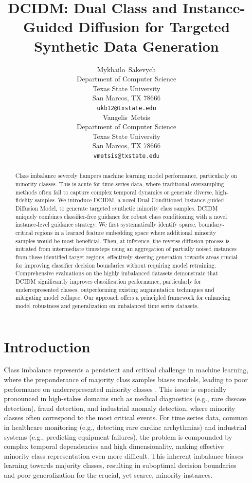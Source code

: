\documentclass{article}
\title{DCIDM: Dual Class and Instance-Guided Diffusion for Targeted Synthetic Data Generation}
\author{%
  Mykhailo~Sakevych \\
  Department of Computer Science\\
  Texas State University\\
  San Marcos, TX 78666 \\
  \texttt{ukb12@txstate.edu} \\
  \And
  Vangelis~Metsis \\
  Department of Computer Science\\
  Texas State University\\
  San Marcos, TX 78666 \\
  \texttt{vmetsis@txstate.edu} \\
}
\begin{document}
\maketitle


\begin{abstract}
Class imbalance severely hampers machine learning model performance, particularly on minority classes. This is acute for time series data, where traditional oversampling methods often fail to capture complex temporal dynamics or generate diverse, high-fidelity samples. We introduce DCIDM, a novel Dual Conditioned Instance-guided Diffusion Model, to generate targeted synthetic minority class samples. DCIDM uniquely combines classifier-free guidance for robust class conditioning with a novel instance-level guidance strategy. We first systematically identify sparse, boundary-critical regions in a learned feature embedding space where additional minority samples would be most beneficial. Then, at inference, the reverse diffusion process is initiated from intermediate timesteps using an aggregation of partially noised instances from these identified target regions, effectively steering generation towards areas crucial for improving classifier decision boundaries without requiring model retraining. Comprehensive evaluations on the highly imbalanced datasets demonstrate that DCIDM significantly improves classification performance, particularly for underrepresented classes, outperforming existing augmentation techniques and mitigating model collapse. Our approach offers a principled framework for enhancing model robustness and generalization on imbalanced time series datasets.
\end{abstract}


\section{Introduction}

Class imbalance represents a persistent and critical challenge in machine learning, where the preponderance of majority class samples biases models, leading to poor performance on underrepresented minority classes \cite{Prati}. This issue is especially pronounced in high-stakes domains such as medical diagnostics (e.g., rare disease detection), fraud detection, and industrial anomaly detection, where minority classes often correspond to the most critical events. For time series data, common in healthcare monitoring (e.g., detecting rare cardiac arrhythmias) and industrial systems (e.g., predicting equipment failures), the problem is compounded by complex temporal dependencies and high dimensionality, making effective minority class representation even more difficult. This inherent imbalance biases learning towards majority classes, resulting in suboptimal decision boundaries and poor generalization for the crucial, yet scarce, minority instances.
\end{document}
